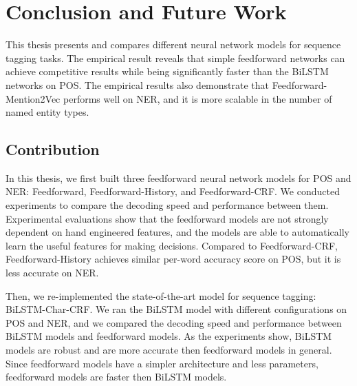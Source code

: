 \documentclass{sfuthesis}
\begin{document}
%
%

\mainmatter%











\chapter{Conclusion and Future Work}

This thesis presents and compares different neural network models for sequence tagging tasks. The empirical result reveals that simple feedforward networks can achieve competitive results while being significantly faster than the BiLSTM networks on POS. The empirical results also demonstrate that Feedforward-Mention2Vec performs well on NER, and it is more scalable in the number of named entity types.

\section{Contribution}
In this thesis, we first built three feedforward neural network models for POS and NER: Feedforward, Feedforward-History, and Feedforward-CRF. We conducted experiments to compare the decoding speed and performance between them. Experimental evaluations show that the feedforward models are not strongly dependent on hand engineered features, and the models are able to automatically learn the useful features for making decisions. Compared to Feedforward-CRF, Feedforward-History achieves similar per-word accuracy score on POS, but it is less accurate on NER. 

Then, we re-implemented the state-of-the-art model for sequence tagging: BiLSTM-Char-CRF. We ran the BiLSTM model with different configurations on POS and NER, and we compared the decoding speed and performance between BiLSTM models and feedforward models. As the experiments show, BiLSTM models are robust and are more accurate then feedforward models in general. Since feedforward models have a simpler architecture and less parameters, feedforward models are faster then BiLSTM models.
\end{document}
